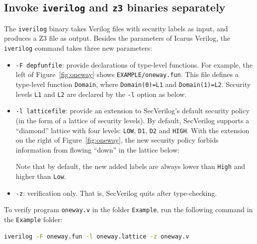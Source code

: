 \documentclass [12pt, oneside, a4paper]{article}
\newcommand{\code}[1]{\texttt{#1}}
\begin{document}
\subsection{Invoke \code{iverilog} and \code{z3} binaries separately}

The \code{iverilog} binary takes Verilog files with security labels as
input, and produces a Z3 file as output. Besides the parameters of
Icarus Verilog, the \code{iverilog} command takes three new parameters:

\begin{itemize}
\item \code{-F depfunfile}: provide declarations of type-level functions. For
example, the left of Figure~\ref{fig:oneway} shows \code{EXAMPLE/oneway.fun}.
This file defines a type-level function \code{Domain}, where
\code{Domain(0)=L1} and \code{Domain(1)=L2}. Security levels \code{L1} and
\code{L2} are declared by the \code{-l} option as below.

\item \code{-l latticefile}: provide an extension to SecVerilog's
default security policy (in the form of a lattice of security levels).
By default, SecVerilog supports a ``diamond'' lattice with four
levels: \code{LOW}, \code{D1}, \code{D2} and \code{HIGH}. With the
extension on the right of Figure~\ref{fig:oneway}, the new security
policy forbids information from flowing ``down'' in the lattice below:


Note that by default, the new added labels are always lower than \code{High}
and higher than \code{Low}.

\item \code{-z}: verification only. That is, SecVerilog quits after
type-checking.
\end{itemize}

To verify program \code{oneway.v} in the folder \code{Example}, run
the following command in the \code{Example} folder:

\begin{lstlisting}[language=bash, frame=none, numbers=none,
keywordstyle=\footnotesize\bfseries, morekeywords={make}]
iverilog -F oneway.fun -l oneway.lattice -z oneway.v
\end{lstlisting}
\end{document}
